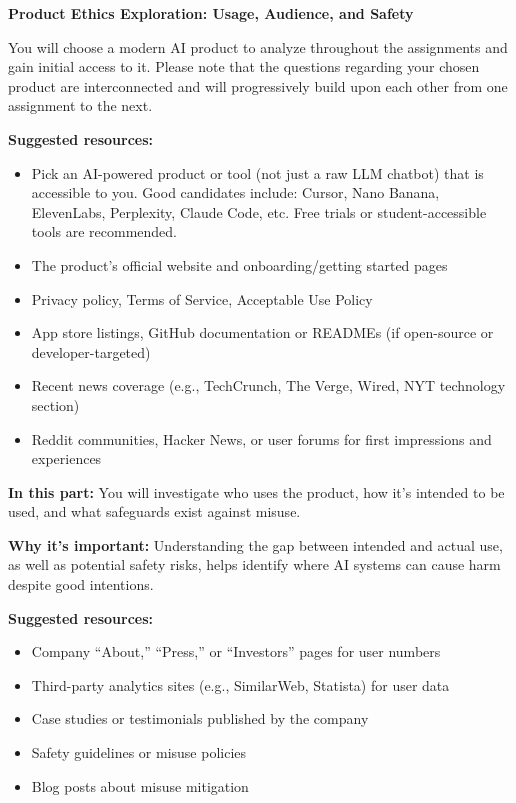 \item {\bf Product Ethics Exploration: Usage, Audience, and Safety}

You will choose a modern AI product to analyze throughout the assignments and gain initial access to it. Please note that the questions regarding your chosen product are interconnected and will progressively build upon each other from one assignment to the next.

\textbf{Suggested resources:}
\begin{itemize}
    \item Pick an AI-powered product or tool (not just a raw LLM chatbot) that is accessible to you. Good candidates include: Cursor, Nano Banana, ElevenLabs, Perplexity, Claude Code, etc. Free trials or student-accessible tools are recommended.
    \item The product's official website and onboarding/getting started pages
    \item Privacy policy, Terms of Service, Acceptable Use Policy
    \item App store listings, GitHub documentation or READMEs (if open-source or developer-targeted)
    \item Recent news coverage (e.g., TechCrunch, The Verge, Wired, NYT technology section)
    \item Reddit communities, Hacker News, or user forums for first impressions and experiences
\end{itemize}


\textbf{In this part:} You will investigate who uses the product, how it's intended to be used, and what safeguards exist against misuse.

\vspace{2mm}

\textbf{Why it's important:} Understanding the gap between intended and actual use, as well as potential safety risks, helps identify where AI systems can cause harm despite good intentions.

\vspace{2mm}

\textbf{Suggested resources:}
\begin{itemize}
  \item Company ``About,'' ``Press,'' or ``Investors'' pages for user numbers
  \item Third-party analytics sites (e.g., SimilarWeb, Statista) for user data
  \item Case studies or testimonials published by the company
  \item Safety guidelines or misuse policies
  \item Blog posts about misuse mitigation
\end{itemize}

\begin{enumerate}
    
    
    
    
    
\end{enumerate}